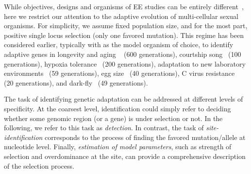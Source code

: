 While objectives, designs and organisms of EE studies can be entirely
different~\cite{Barrick2013Genome,schlotterer2015combining}, here we
restrict our attention to the adaptive evolution of multi-cellular
sexual organisms.  For simplicity, we assume fixed population size,
and for the most part, positive single locus selection (only one
favored mutation). This regime has been considered earlier, typically
with \dmel as the model organism of choice, to identify adaptive genes
in longevity and aging ~\cite{burke2010genome,remolina2012genomic}
(600 generations), courtship song~\cite{turner2011population} (100
generations), hypoxia tolerance~\cite{zhou2011experimental} (200
generations), adaptation to new laboratory
environments~\cite{orozco2012adaptation,franssen2015patterns} (59
generations), egg size~\cite{jha2015whole} (40 generations), C virus
resistance~\cite{martins2014host} (20 generations), and
dark-fly~\cite{izutsu2015dynamics} (49 generations).


The task of identifying genetic adaptation can be addressed at
different levels of specificity. At the coarsest level, identification
could simply refer to deciding whether some genomic region (or a gene)
is under selection or not. In the following, we refer to this task as
\emph{detection}. In contrast, the task of \emph{site-identification}
corresponds to the process of finding the favored mutation/allele at
nucleotide level. Finally, \emph{estimation of model parameters}, such
as strength of selection and overdominance at the site, can provide a
comprehensive description of the selection process.

